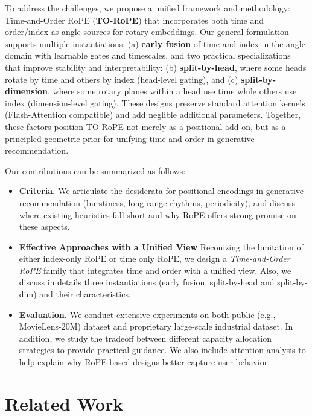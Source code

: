 \documentclass[sigconf]{acmart}
\begin{document}
To address the challenges, we propose a unified framework and methodology: Time-and-Order RoPE (\textbf{TO-RoPE}) that incorporates both time and order/index as angle sources for rotary embeddings. Our general formulation supports multiple instantiations: (a) \textbf{early fusion} of time and index in the angle domain with learnable gates and timescales, and two practical specializations that improve stability and interpretability: (b) \textbf{split-by-head}, where some heads rotate by time and others by index (head-level gating), and (c) \textbf{split-by-dimension}, where some rotary planes within a head use time while others use index (dimension-level gating). These designs preserve standard attention kernels (Flash-Attention \cite{Dao2022FlashAttentionFA, Dao2023FlashAttention2FA} compatible) and add neglible additional parameters. Together, these factors position TO-RoPE not merely as a positional add-on, but as a principled geometric prior for unifying time and order in generative recommendation. 

Our contributions can be summarized as follows:
\begin{itemize}
\item \textbf{Criteria.} We articulate the desiderata for positional encodings in generative recommendation (burstiness, long-range rhythms, periodicity), and discuss where existing heuristics fall short and why RoPE offers strong promise on these aspects.
\item \textbf{Effective Approaches with a Unified View} Reconizing the limitation of either index-only RoPE or time only RoPE, we design a \emph{Time-and-Order RoPE} family that integrates time and order with a unified view. Also, we discuss in details three instantiations (early fusion, split-by-head and split-by-dim) and their characteristics. 
\item \textbf{Evaluation.} We conduct extensive experiments on both public (e.g., MovieLens-20M) dataset and proprietary large-scale industrial dataset. In addition, we study the tradeoff between different capacity allocation strategies to provide practical guidance. We also include attention analysis to help explain why RoPE-based designs better capture user behavior.
\end{itemize}




\section{Related Work}
\end{document}
